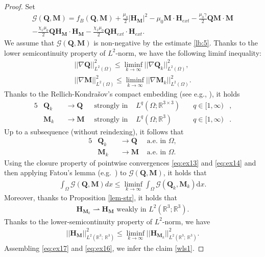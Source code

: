 \documentclass{article}
\def\Qvec{\mathbf{Q}}
\def \Mvec{\mathbf{M}}
\def\Hvec{\mathbf{H}}
\def\d{\mathrm{d}}
\begin{document}
\begin{proof}
Set 
\begin{eqnarray}
\mathscr{G}\left(\Qvec,\Mvec\right)
=f_B\left(\Qvec, \Mvec\right) + \frac{\mu_0}{2}|\Hvec_{\Mvec}|^2 - \mu_0\Mvec\cdot \Hvec_{ext}
- \frac{\mu_0\gamma}{2}\Qvec\Mvec\cdot\Mvec\nonumber\\ - \frac{\chi_1\mu_0}{2}\Qvec\Hvec_{\Mvec}\cdot\Hvec_{\Mvec} - \frac{\chi_1\mu_0}{2}\Qvec\Hvec_{ext}\cdot\Hvec_{ext}.\nonumber
\end{eqnarray} 
We assume that $\mathscr{G}\left(\Qvec,\Mvec\right)$ is non-negative by the estimate \eqref{lb:5}.
Thanks to the lower semicontinuity property of $L^2$-norm, we have the following liminf inequality:
\begin{eqnarray}
||\nabla \Qvec||^2_{L^2\left(\Omega\right)} \le  \liminf_{k\rightarrow\infty}||\nabla \Qvec_k||^2_{L^2\left(\Omega\right)},\label{eq:ex9}\\
||\nabla \Mvec||^2_{L^2\left(\Omega\right)}\le  \liminf_{k\rightarrow\infty}||\nabla \Mvec_k||^2_{L^2\left(\Omega\right)}. \label{eq:ex10}
\end{eqnarray}
Thanks to the Rellich-Kondra\v{s}ov's compact embedding (see e.g., \cite[Theorem 6.1-5]{ciarlet2021mathematical}), it holds   
\begin{alignat}{5}
&\Qvec_k& &\rightarrow\Qvec &~\mbox{ strongly in }& L^q\left(\Omega;\mathbb R^{3\times 3}\right) &\quad q\in [1, \infty)&,\\
&\Mvec_k& &\rightarrow\Mvec &~\mbox{ strongly in }& L^q\left(\Omega;\mathbb R^3\right) &\quad q\in [1, \infty)&.
\end{alignat}\label{eq:ex12}
Up to a subsequence (without reindexing), it follows that
\begin{alignat}{5}
&\Qvec_k& &\rightarrow \Qvec& \mbox{ a.e. in } \Omega,\label{eq:ex13}\\
&\Mvec_k& &\rightarrow \Mvec& \mbox{ a.e. in } \Omega.\label{eq:ex14}
\end{alignat}
Using the closure property of pointwise convergences \eqref{eq:ex13} and \eqref{eq:ex14} and then applying Fatou's lemma (e.g.\ \cite{Rindler}) to $\mathscr{G}\left(\Qvec,\Mvec\right)$, it holds that
\begin{eqnarray}
\int_{\Omega}\mathscr{G}\left(\Qvec,\Mvec\right)dx\le\liminf_{k\rightarrow\infty}\int_{\Omega}\mathscr{G}\left(\Qvec_k,\Mvec_k\right)\d x.\label{eq:ex16}
\end{eqnarray} 
Moreover, thanks to Proposition \ref{lem-str}, it holds that
\begin{eqnarray}
\Hvec_{\Mvec_k}\rightharpoonup\Hvec_{\Mvec} \mbox{ weakly in } L^2\left(\mathbb R^3; \mathbb R^3\right).
\end{eqnarray}
Thanks to the lower-semicontinuity property of $L^2$-norm, we have
\begin{eqnarray}
||\Hvec_{\Mvec}||^2_{L^2\left(\mathbb R^3;~\mathbb R^3\right)}\le  \liminf_{k\rightarrow\infty}||\Hvec_{\Mvec_k}||^2_{L^2\left(\mathbb R^3;~\mathbb R^3\right)}. \label{eq:ex17}
\end{eqnarray}
Assembling \eqref{eq:ex17} and \eqref{eq:ex16}, we infer the claim \eqref{wls1}.
\end{proof}
\end{document}
